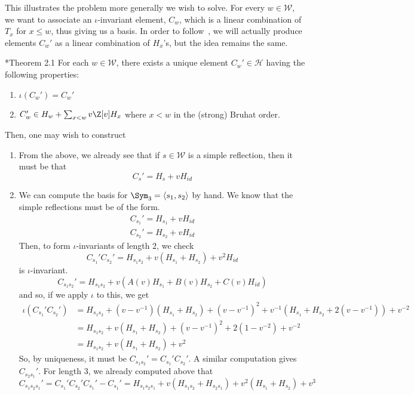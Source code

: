 \documentclass[11pt,leqno,oneside]{amsart}
\numberwithin{thm}{section}
\renewcommand{\W}{\mathcal{W}}
\renewcommand{\H}{\mathcal{H}} %
\begin{document}
 This illustrates the problem more generally we wish to solve. For
 every \(w \in \W\), we want to associate an \(\iota\)-invariant
 element, \(C_w\), which is a linear combination of \(T_x\) for \(x
 \leq w\), thus giving us a basis. In order to follow~\cite{soergel},
 we will actually produce elements \(C_w'\) as a linear combination of
 \(H_x\)'s, but the idea remains the same.
\begin{thm}\label{thm:KL}
  \cite{soergel}*{Theorem 2.1} For each \(w \in \W\), there exists a
  unique element \(C_w' \in \H\) having the following properties:
  \begin{enumerate}
  \item \(\iota(C_w') = C_w'\) 
  \item \(C_w' \in H_w + \sum_{x < w} v \Z[v] H_x\) where \(x < w\) in
    the (strong) Bruhat order.
  \end{enumerate}
\end{thm}
Then, one may wish to construct 
\begin{example}
  \begin{enumerate}
  \item From the above, we already see that if \(s \in \W\) is a simple
    reflection, then it must be that \[
      C_s' = H_s+v H_{id}
    \]
  \item We can compute the basis for \(\Sym_3 = \langle s_1, s_2
    \rangle\) by hand. We know that the simple reflections must be of
    the form.
    \begin{align*}
      C_{s_1}' = H_{s_1} +vH_{id}\\
      C_{s_2}' = H_{s_2}+vH_{id}
    \end{align*}
    Then, to form \(\iota\)-invariants of length \(2\), we check \[
      C_{s_1}' C_{s_2}' = H_{s_1 s_2} + v(H_{s_1}+H_{s_2}) + v^2 H_{id}
    \]
    is \(\iota\)-invariant. 
    \[
      C_{s_1 s_2}' = H_{s_1 s_2} + v(A(v)H_{s_1}+B(v)H_{s_2} + C(v)H_{id})
    \]
    and so, if we apply \(\iota\) to this, we get
    \begin{align*}
      \iota (C_{s_1}' C_{s_2}')
      & = H_{s_1 s_2}+(v-v^{-1})(H_{s_1} + H_{s_2})+(v-v^{-1})^2 +
        v^{-1}(H_{s_1} + H_{s_2}+2(v-v^{-1})) + v^{-2} \\
      & = H_{s_1 s_2} + v(H_{s_1}+H_{s_2}) + (v-v^{-1})^2 +
        2(1-v^{-2}) + v^{-2} \\
      & = H_{s_1 s_2} + v(H_{s_1}+H_{s_2}) + v^2
    \end{align*}
    So, by uniqueness, it must be \(C_{s_1 s_2}' = C_{s_1}'
    C_{s_2}'\). A similar computation gives \(C_{s_2 s_1}'\). For
    length \(3\), we already computed above that \[
      C_{s_1 s_2 s_1}' = C_{s_1}' C_{s_2}' C_{s_1}' - C_{s_1}' =
      H_{s_1 s_2 s_1} + v(H_{s_1 s_2} + H_{s_2 s_1}) +
      v^2(H_{s_1}+H_{s_2}) + v^3
    \]
  \end{enumerate}
\end{example}
\end{document}
